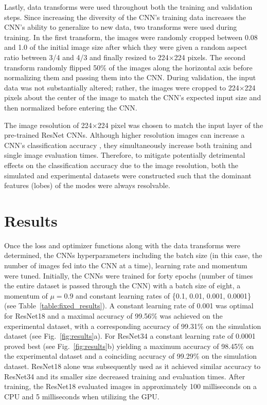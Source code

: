\documentclass[10pt,journal,compsoc]{IEEEtran}
\begin{document}
Lastly, data transforms were used throughout both the training and validation steps. Since increasing the diversity of the CNN's training data increases the CNN's ability to generalize to new data, two transforms were used during training. In the first transform, the images were randomly cropped between 0.08 and 1.0 of the initial image size after which they were given a random aspect ratio between 3/4 and 4/3 and finally resized to 224$\times$224 pixels. The second transform randomly flipped 50\% of the images along the horizontal axis before normalizing them and passing them into the CNN. During validation, the input data was not substantially altered; rather, the images were cropped to 224$\times$224 pixels about the center of the image to match the CNN's expected input size and then normalized before entering the CNN.

The image resolution of 224$\times$224 pixel was chosen to match the input layer of the pre-trained ResNet CNNs.
Although higher resolution images can increase a CNN's classification accuracy \cite{wu2015deep}, they simultaneously increase both training and single image evaluation times. Therefore, to mitigate potentially detrimental effects on the classification accuracy due to the image resolution, both the simulated and experimental datasets were constructed such that the dominant features (lobes) of the modes were always resolvable.

\section*{Results}

Once the loss and optimizer functions along with the data transforms were determined, the CNNs hyperparameters including the batch size (in this case, the number of images fed into the CNN at a time), learning rate and momentum were tuned. Initially, the CNNs were trained for forty epochs (number of times the entire dataset is passed through the CNN) with a batch size of eight, a momentum of $\mu=0.9$ and constant learning rates of \{0.1, 0.01, 0.001, 0.0001\} (see Table~\ref{table:fixed_results}). A constant learning rate of 0.001 was optimal for ResNet18 and a maximal accuracy of 99.56\% was achieved on the experimental dataset, with a corresponding accuracy of 99.31\% on the simulation dataset (see Fig.~\ref{fig:results}a). For ResNet34 a constant learning rate of 0.0001 proved best (see Fig.~\ref{fig:results}b) yielding a maximum accuracy of 98.45\% on the experimental dataset and a coinciding accuracy of 99.29\% on the simulation dataset. ResNet18 alone was subsequently used as it achieved similar accuracy to ResNet34 and its smaller size decreased training and evaluation times.  After training, the ResNet18 evaluated images in approximately 100 milliseconds on a CPU and 5 milliseconds when utilizing the GPU.
\end{document}
